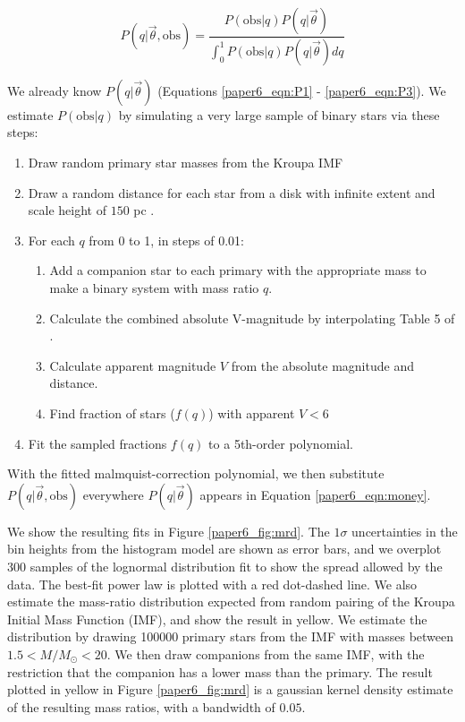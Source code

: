 \begin{equation}
P(q|\vec{\theta}, \mathrm{obs}) = \frac{P(\mathrm{obs}|q) P(q|\vec{\theta})}{\int_0^1 P(\mathrm{obs}|q) P(q|\vec{\theta}) dq}
\end{equation}

We already know $P(q|\vec{\theta})$ (Equations \ref{paper6_eqn:P1} - \ref{paper6_eqn:P3}). We estimate $P(\mathrm{obs}|q)$ by simulating a very large sample of binary stars via these steps:

\begin{enumerate}
\item Draw random primary star masses from the Kroupa IMF \citep{Kroupa2002}
\item Draw a random distance for each star from a disk with infinite extent and scale height of $150$ pc \citep[the approximate scale height of the Milky Way disk for A-type stars,][]{BM1998}. 
\item For each $q$ from 0 to 1, in steps of 0.01:
\begin{enumerate}
  \item Add a companion star to each primary with the appropriate mass to make a binary system with mass ratio $q$.
  \item Calculate the combined absolute V-magnitude by interpolating Table 5 of \citet{Pecaut2013}.
  \item Calculate apparent magnitude $V$ from the absolute magnitude and distance.
  \item Find fraction of stars ($f(q)$) with apparent $V < 6$
\end{enumerate}
\item Fit the sampled fractions $f(q)$ to a 5th-order polynomial.
\end{enumerate}

With the fitted malmquist-correction polynomial, we then substitute $P(q|\vec{\theta}, \mathrm{obs})$ everywhere $P(q|\vec{\theta})$ appears in Equation \ref{paper6_eqn:money}.

We show the resulting fits in Figure \ref{paper6_fig:mrd}. The $1\sigma$ uncertainties in the bin heights from the histogram model are shown as error bars, and we overplot 300 samples of the lognormal distribution fit to show the spread allowed by the data. The best-fit power law is plotted with a red dot-dashed line. We also estimate the mass-ratio distribution expected from random pairing of the Kroupa Initial Mass Function (IMF), and show the result in yellow. We estimate the distribution by drawing 100000 primary stars from the IMF with masses between $1.5 < M/M_{\odot} < 20$. We then draw companions from the same IMF, with the restriction that the companion has a lower mass than the primary. The result plotted in yellow in Figure \ref{paper6_fig:mrd} is a gaussian kernel density estimate of the resulting mass ratios, with a bandwidth of $0.05$.



